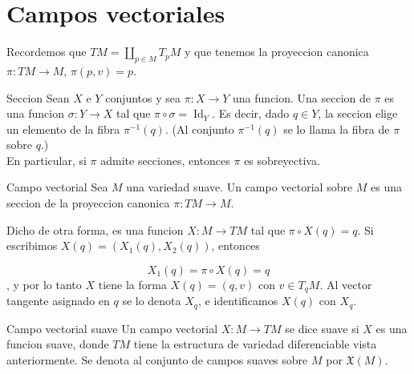 \section{Campos vectoriales}
\begin{bookremark}{}
Recordemos que $TM=\coprod_{p \in M}T_pM$ y que tenemos la proyeccion canonica $\pi:TM \to M$, $\pi(p,v)=p$.

\end{bookremark}
\begin{bookdefinition}{Seccion}
Sean $X$ e $Y$ conjuntos y sea $\pi:X \to Y$ una funcion. Una seccion de $\pi$ es una funcion $\sigma:Y \to X$ tal que $\pi \circ \sigma=\operatorname{Id}_Y$. Es decir, dado $q \in Y$, la seccion elige un elemento de la fibra $\pi^{-1}(q)$. (Al conjunto $\pi^{-1}(q)$ se lo llama la fibra de $\pi$ sobre $q$.)\\
En particular, si $\pi$ admite secciones, entonces $\pi$ es sobreyectiva. 


\end{bookdefinition}
\begin{bookdefinition}{Campo vectorial}
Sea $M$ una variedad suave. Un campo vectorial sobre $M$ es una seccion de la proyeccion canonica $\pi:TM \to M$.

Dicho de otra forma, es una funcion $X:M \to TM$ tal que $\pi \circ X(q)=q$. Si escribimos $X(q)=(X_1(q),X_2(q))$, entonces

\[
X_1(q)=\pi\circ X(q)=q
\]
, y por lo tanto $X$ tiene la forma $X(q)=(q,v)$ con $v \in T_qM$. Al vector tangente asignado en $q$ se lo denota $X_q$, e identificamos $X(q)$ con $X_q$.

\end{bookdefinition}
\begin{bookdefinition}{Campo vectorial suave}
Un campo vectorial $X:M \to TM$ se dice suave si $X$ es una funcion suave, donde $TM$ tiene la estructura de variedad diferenciable vista anteriormente. Se denota al conjunto de campos suaves sobre $M$ por $\mathfrak X(M)$.

\end{bookdefinition}
